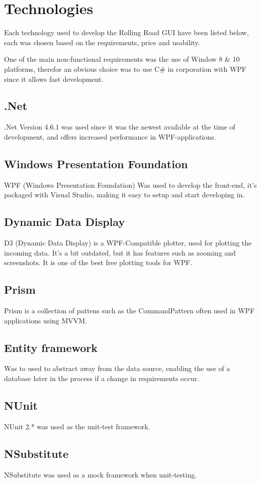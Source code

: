\chapter{Technologies}

Each technology used to develop the Rolling Road GUI have been listed below, each was chosen based on the requirements, price and usability.

One of the main non-functional requirements was the use of Window 8 \& 10 platforms, therefor an obvious choice was to use C\# in corporation with WPF since it allows fast development.

\section{.Net}

.Net Version 4.6.1 was used since it was the newest available at the time of development, and offers increased performance in WPF-applications. 

\section{Windows Presentation Foundation}

WPF (Windows Presentation Foundation) Was used to develop the front-end, it's packaged with Visual Studio, making it easy to setup and start developing in.

\section{Dynamic Data Display}

D3 (Dynamic Data Display) is a WPF-Compatible plotter, used for plotting the incoming data. It's a bit outdated, but it has features such as zooming and screenshots. It is one of the best free plotting tools for WPF.

\section{Prism}

Prism is a collection of pattens such as the CommandPattern often used in WPF applications using MVVM.

\section{Entity framework}

Was to used to abstract away from the data source, enabling the use of a database later in the process if a change in requirements occur.

\section{NUnit}

NUnit 2.* was used as the unit-test framework.

\section{NSubstitute}

NSubstitute was used as a mock framework when unit-testing.